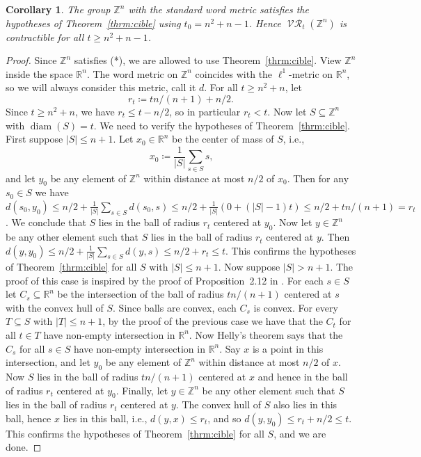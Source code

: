 \documentclass[a4paper,11pt]{amsart}
\newtheorem{corollary}[theorem]{Corollary}
\theoremstyle{definition}
\newcommand{\Z}{\mathbb{Z}}
\newcommand{\R}{\mathbb{R}}
\DeclareMathOperator{\diam}{diam}
\DeclareMathOperator{\Rips}{\mathcal{VR}}
\numberwithin{equation}{section}
\begin{document}
\begin{corollary}\label{cor:Zn}
The group $\Z^n$ with the standard word metric satisfies the hypotheses of Theorem~\ref{thrm:cible} using $t_0=n^2+n-1$. Hence $\Rips_t(\Z^n)$ is contractible for all $t\ge n^2+n-1$.
\end{corollary}

\begin{proof}
Since $\Z^n$ satisfies (*), we are allowed to use Theorem~\ref{thrm:cible}. View $\Z^n$ inside the space $\R^n$. The word metric on $\Z^n$ coincides with the $\ell^1$-metric on $\R^n$, so we will always consider this metric, call it $d$. For all $t\ge n^2+n$, let
\[
r_t\coloneqq tn/(n+1) + n/2\text{.}
\]
Since $t\ge n^2+n$, we have $r_t\le t - n/2$, so in particular $r_t<t$. Now let $S\subseteq \Z^n$ with $\diam(S)=t$. We need to verify the hypotheses of Theorem~\ref{thrm:cible}. First suppose $|S|\le n+1$. Let $x_0 \in \R^n$ be the center of mass of $S$, i.e.,
\[
x_0\coloneq \frac{1}{|S|}\sum\limits_{s\in S} s\text{,}
\]
and let $y_0$ be any element of $\Z^n$ within distance at most $n/2$ of $x_0$. Then for any $s_0\in S$ we have $d(s_0,y_0)\le n/2 + \frac{1}{|S|}\sum\limits_{s\in S}d(s_0,s) \le n/2 + \frac{1}{|S|}(0+(|S|-1)t)\le n/2 + tn/(n+1) = r_t$. We conclude that $S$ lies in the ball of radius $r_t$ centered at $y_0$. Now let $y\in\Z^n$ be any other element such that $S$ lies in the ball of radius $r_t$ centered at $y$. Then $d(y,y_0)\le n/2 + \frac{1}{|S|}\sum\limits_{s\in S}d(y,s) \le n/2 + r_t \le t$. This confirms the hypotheses of Theorem~\ref{thrm:cible} for all $S$ with $|S|\le n+1$. Now suppose $|S|>n+1$. The proof of this case is inspired by the proof of Proposition~2.12 in \cite{amir85}. For each $s\in S$ let $C_s\subseteq \R^n$ be the intersection of the ball of radius $tn/(n+1)$ centered at $s$ with the convex hull of $S$. Since balls are convex, each $C_s$ is convex. For every $T\subseteq S$ with $|T|\le n+1$, by the proof of the previous case we have that the $C_t$ for all $t\in T$ have non-empty intersection in $\R^n$. Now Helly's theorem says that the $C_s$ for all $s\in S$ have non-empty intersection in $\R^n$. Say $x$ is a point in this intersection, and let $y_0$ be any element of $\Z^n$ within distance at most $n/2$ of $x$. Now $S$ lies in the ball of radius $tn/(n+1)$ centered at $x$ and hence in the ball of radius $r_t$ centered at $y_0$. Finally, let $y\in\Z^n$ be any other element such that $S$ lies in the ball of radius $r_t$ centered at $y$. The convex hull of $S$ also lies in this ball, hence $x$ lies in this ball, i.e., $d(y,x)\le r_t$, and so $d(y,y_0)\le r_t + n/2 \le t$. This confirms the hypotheses of Theorem~\ref{thrm:cible} for all $S$, and we are done.
\end{proof}
\end{document}
